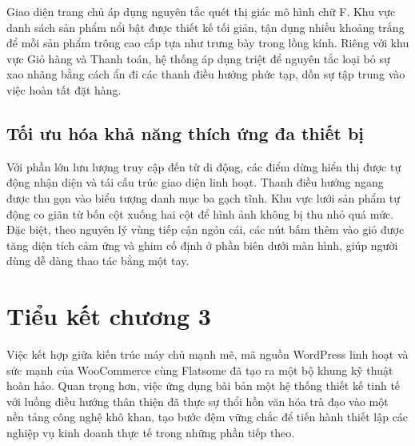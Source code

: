 Giao diện trang chủ áp dụng nguyên tắc quét thị giác mô hình chữ F. Khu vực danh sách sản phẩm nổi bật được thiết kế tối giản, tận dụng nhiều khoảng trắng để mỗi sản phẩm trông cao cấp tựa như trưng bày trong lồng kính. Riêng với khu vực Giỏ hàng và Thanh toán, hệ thống áp dụng triệt để nguyên tắc loại bỏ sự xao nhãng bằng cách ẩn đi các thanh điều hướng phức tạp, dồn sự tập trung vào việc hoàn tất đặt hàng.

\subsection{Tối ưu hóa khả năng thích ứng đa thiết bị}
Với phần lớn lưu lượng truy cập đến từ di động, các điểm dừng hiển thị được tự động nhận diện và tái cấu trúc giao diện linh hoạt. Thanh điều hướng ngang được thu gọn vào biểu tượng danh mục ba gạch tĩnh. Khu vực lưới sản phẩm tự động co giãn từ bốn cột xuống hai cột để hình ảnh không bị thu nhỏ quá mức. Đặc biệt, theo nguyên lý vùng tiếp cận ngón cái, các nút bấm thêm vào giỏ được tăng diện tích cảm ứng và ghim cố định ở phần biên dưới màn hình, giúp người dùng dễ dàng thao tác bằng một tay.

\section*{Tiểu kết chương 3}
Việc kết hợp giữa kiến trúc máy chủ mạnh mẽ, mã nguồn WordPress linh hoạt và sức mạnh của WooCommerce cùng Flatsome đã tạo ra một bộ khung kỹ thuật hoàn hảo. Quan trọng hơn, việc ứng dụng bài bản một hệ thống thiết kế tinh tế với luồng điều hướng thân thiện đã thực sự thổi hồn văn hóa trà đạo vào một nền tảng công nghệ khô khan, tạo bước đệm vững chắc để tiến hành thiết lập các nghiệp vụ kinh doanh thực tế trong những phần tiếp theo.